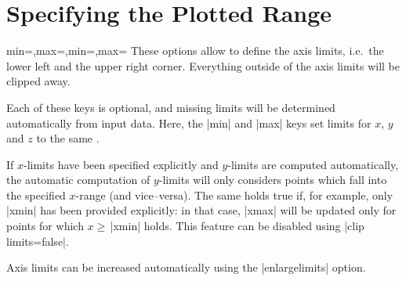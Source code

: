 

\section{Specifying the Plotted Range}

\begin{pgfplotsxykeylist}{\x min=,\x max=,min=,max=}
These options allow to define the axis limits, i.e.\ the lower left and the upper right corner. Everything outside of the axis limits will be clipped away.

Each of these keys is optional, and missing limits will be determined automatically from input data. Here, the |min| and |max| keys set limits for $x$, $y$ and $z$ to the same .

If $x$-limits have been specified explicitly and $y$-limits are computed automatically, the automatic computation of $y$-limits will only considers points which fall into the specified $x$-range (and vice--versa). The same holds true if, for example, only |xmin| has been provided explicitly: in that case, |xmax| will be updated only for points for which $x \ge \,$|xmin| holds. This feature can be disabled using |clip limits=false|. 

Axis limits can be increased automatically using the |enlargelimits| option.
\begin{codeexample}[]
\end{codeexample}

\begin{codeexample}[]
\end{codeexample}

\begin{codeexample}[]
\end{codeexample}


\end{pgfplotsxykeylist}
